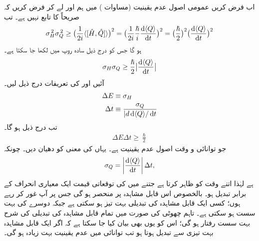 اب فرض کریں  عمومی اصول  عدم یقینیت (مساوات )  میں ہم   اور  لے کر    فرض کریں کہ  صریحاً  کا تابع نہیں ہے۔ تب
\begin{align*}
\sigma_{H}^{\,2} \sigma_{Q}^{\,2} \geq \big( \frac{1}{2i} \langle [ \hat{H}, \hat{Q} ] \rangle \big)^{2} = \big( \frac{1}{2i} \frac{\hslash}{i} \frac{\dif \, \langle Q \rangle}{\dif t} \big)^{2} = \big( \frac{\hslash}{2} \big)^{2} \big( \frac{\dif\, \langle Q \rangle}{\dif t} \big)^{2} 
\end{align*}
ہو گا جس کو  درج ذیل سادہ روپ میں  لکھا جا سکتا ہے۔ 
\begin{align*}
\sigma_{H} \sigma_{Q} \geq \frac{\hslash}{2} \big | \frac{\dif \,\langle Q \rangle}{\dif t} \big| 
\end{align*}
آئیں  اور  کی تعریفات درج ذیل لیں۔ 
\begin{align}
\Delta E &\equiv \sigma_{H} \nonumber \\
\Delta t &\equiv \frac{\sigma_{Q}}{|d\dif\, \langle Q \rangle / \dif t} 
\end{align}
تب درج ذیل ہو گا۔
\begin{align}\label{مساوات_قواعد_توانائی_و_وقت_اصول_عدم_یقینیت}
\Delta E \Delta t \geq \frac{\hslash}{2}
\end{align}
جو توانائی و وقت  اصول عدم یقینیت   ہے۔ یہاں  کی معنی کو دھیان دیں۔ چونکہ 
\begin{align*}
\sigma_{Q} = \left| \frac{\dif\, \langle Q \rangle}{\dif t} \right| \Delta t ,
\end{align*}
ہے لہٰذا  اتنے وقت کو ظاہر کرتا ہے جتنے میں  کی توقعاتی  قیمت ایک معیاری انحراف کے برابر تبدیل ہو۔ بالخصوص  اس قابل مشاہدہ  پر منحصر ہو گی جس پر آپ غور کر رہے ہوں؛  کسی ایک قابل مشاہدہ کی تبدیلی بہت تیز ہو سکتی ہے جبکہ دوسرے کی بہت سست ہو سکتی ہے۔ تاہم   چھوٹی  کی صورت میں تمام قابل مشاہدہ کی تبدیلی کی شرح بہت سست رفتار  ہو گی؛ اس کو یوں بھی بیان کیا جا سکتا ہے کہ اگر ایک قابل مشاہدہ بہت تیزی سے تبدیل ہوتا ہو  تب توانائی میں عدم یقینیت بہت زیادہ ہو گی۔

